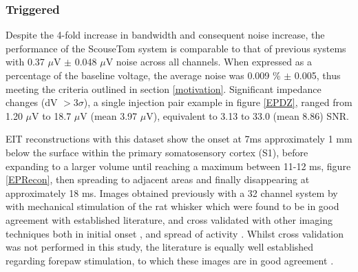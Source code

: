 \subsubsection{Triggered}

Despite the 4-fold increase in bandwidth and consequent noise increase, the performance of the ScouseTom system is comparable to that of previous systems \cite{Oh2011} with 0.37 $\mu$V $\pm$ 0.048 $\mu$V noise across all channels. When expressed as a percentage of the baseline voltage, the average noise was 0.009 \% $\pm$ 0.005, thus meeting the criteria outlined in section \ref{motivation}.  Significant impedance changes (dV $> 3\sigma$), a single injection pair example in figure \ref{EPDZ}, ranged from 1.20 $\mu$V to 18.7 $\mu$V (mean 3.97 $\mu$V), equivalent to 3.13 to 33.0 (mean 8.86) SNR. 

EIT reconstructions with this dataset show the onset at 7ms approximately 1 mm below the surface within the primary somatosensory cortex (S1), before expanding to a larger volume until reaching a maximum between 11-12 ms, figure \ref{EPRecon}, then spreading to adjacent areas and finally disappearing at approximately 18 ms. Images obtained previously with a 32 channel system by \citet{Aristovich_2016} with mechanical stimulation of the rat whisker which were found to be in good agreement with established literature, and cross validated with other imaging techniques both in initial onset \cite{armstrong1991thalamo}, and spread of activity \cite{petersen2007functional}. Whilst cross validation was not performed in this study, the literature is equally well established regarding forepaw stimulation, to which these images are in good agreement \cite{peeters2001comparing} \cite{masamoto2007relationship} \cite{lowe2007small}.

